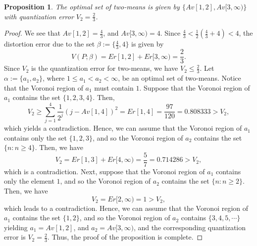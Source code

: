 \documentclass[12pt, reqno]{amsart}
\theoremstyle{plain}
\newtheorem{prop}[subsection]{Proposition}
\theoremstyle{definition}
\newcommand{\set}[1]{\{#1\}}%
\newcommand{\ga}{\alpha}
\newcommand{\gb}{\beta}
\begin{document}
\begin{prop} \label{prop43}
The optimal set of two-means is given by $\set{Av[1,2], Av[3, \infty)}$ with quantization error $V_2=\frac{2}{3}$.
\end{prop}
\begin{proof} We see that $Av[1,2]=\frac 43$, and $Av[3, \infty)=4$.
Since $\frac 43<\frac 12(\frac 43+4)<4$, the distortion error due to the set $\gb:=\set{\frac 43, 4}$ is given by
\[V(P; \gb)=Er[1,2]+Er[3, \infty)=\frac 23.\]
Since $V_2$ is the quantization error for two-means, we have $V_2\leq \frac 23$. Let $\ga:=\set{a_1, a_2}$, where $1\leq a_1<a_2<\infty$, be an optimal set of two-means. Notice that the Voronoi region of $a_1$ must contain $1$. Suppose that the Voronoi region of $a_1$ contains the set $\set{1, 2, 3, 4}$. Then,
\[V_2\geq \sum_{j=1}^4\frac 1 {2^j} (j-Av[1,4])^2=Er[1,4]=\frac{97}{120}=0.808333>V_2,\]
which yields a contradiction. Hence, we can assume that the Voronoi region of $a_1$ contains only the set $\set{1,2,3}$, and so the Voronoi region of $a_2$ contains the set $\set{n : n\geq 4}$. Then, we have
\[V_2=Er[1,3]+Er[4, \infty)=\frac{5}{7}=0.714286>V_2,\]
which is a contradiction. Next, suppose that the Voronoi region of $a_1$ contains only the element $1$, and so the Voronoi region of $a_2$ contains the set $\set{n : n\geq 2}$. Then, we have
\[V_2=Er[2, \infty)=1>V_2,\]
which leads to a contradiction. Hence, we can assume that the Voronoi region of $a_1$ contains the set $\set{1, 2}$, and so the Voronoi region of $a_2$ contains $\set{3, 4, 5, \cdots}$ yielding $a_1=Av[1,2]$, and $a_2=Av[3, \infty)$, and the corresponding quantization error is $V_2=\frac 23$. Thus, the proof of the proposition is complete.
\end{proof}
\end{document}
